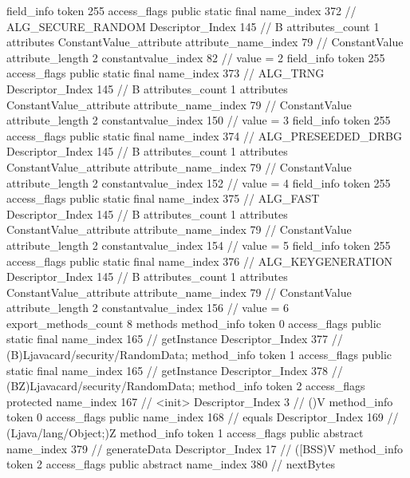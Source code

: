 {{{{{{{				}
				}
			}
			field_info {
				token	255
				access_flags	public static final
				name_index	372		// ALG_SECURE_RANDOM
				Descriptor_Index	145		// B
				attributes_count	1
				attributes {
				ConstantValue_attribute {
					attribute_name_index	79		// ConstantValue
					attribute_length	2
					constantvalue_index	82		// value = 2
				}
				}
			}
			field_info {
				token	255
				access_flags	public static final
				name_index	373		// ALG_TRNG
				Descriptor_Index	145		// B
				attributes_count	1
				attributes {
				ConstantValue_attribute {
					attribute_name_index	79		// ConstantValue
					attribute_length	2
					constantvalue_index	150		// value = 3
				}
				}
			}
			field_info {
				token	255
				access_flags	public static final
				name_index	374		// ALG_PRESEEDED_DRBG
				Descriptor_Index	145		// B
				attributes_count	1
				attributes {
				ConstantValue_attribute {
					attribute_name_index	79		// ConstantValue
					attribute_length	2
					constantvalue_index	152		// value = 4
				}
				}
			}
			field_info {
				token	255
				access_flags	public static final
				name_index	375		// ALG_FAST
				Descriptor_Index	145		// B
				attributes_count	1
				attributes {
				ConstantValue_attribute {
					attribute_name_index	79		// ConstantValue
					attribute_length	2
					constantvalue_index	154		// value = 5
				}
				}
			}
			field_info {
				token	255
				access_flags	public static final
				name_index	376		// ALG_KEYGENERATION
				Descriptor_Index	145		// B
				attributes_count	1
				attributes {
				ConstantValue_attribute {
					attribute_name_index	79		// ConstantValue
					attribute_length	2
					constantvalue_index	156		// value = 6
				}
				}
			}
			}
			export_methods_count	8
			methods {
				method_info {
					token	0
					access_flags	public static final
					name_index	165		// getInstance
					Descriptor_Index	377		// (B)Ljavacard/security/RandomData;
				}
				method_info {
					token	1
					access_flags	public static final
					name_index	165		// getInstance
					Descriptor_Index	378		// (BZ)Ljavacard/security/RandomData;
				}
				method_info {
					token	2
					access_flags	protected
					name_index	167		// <init>
					Descriptor_Index	3		// ()V
				}
				method_info {
					token	0
					access_flags	public
					name_index	168		// equals
					Descriptor_Index	169		// (Ljava/lang/Object;)Z
				}
				method_info {
					token	1
					access_flags	public abstract
					name_index	379		// generateData
					Descriptor_Index	17		// ([BSS)V
				}
				method_info {
					token	2
					access_flags	public abstract
					name_index	380		// nextBytes
}}}}}
